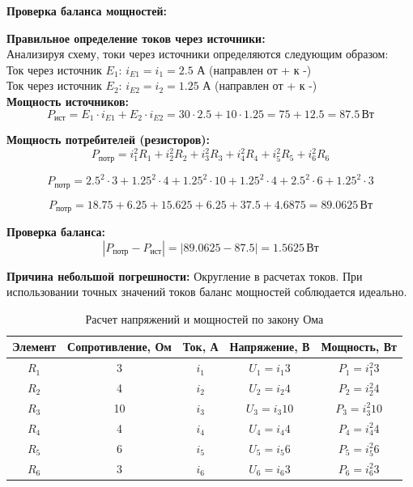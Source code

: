 \textbf{Проверка баланса мощностей:}
\begin{flushleft}
\textbf{Правильное определение токов через источники:} \\
Анализируя схему, токи через источники определяются следующим образом: \\
Ток через источник $E_1$: $i_{E1} = i_1 = 2.5$ А (направлен от + к -) \\
Ток через источник $E_2$: $i_{E2} = i_2 = 1.25$ А (направлен от + к -) \\

\textbf{Мощность источников:}
\begin{equation}
P_{\text{ист}} = E_1 \cdot i_{E1} + E_2 \cdot i_{E2} = 30 \cdot 2.5 + 10 \cdot 1.25 = 75 + 12.5 = 87.5\,\text{Вт}
\end{equation}

\textbf{Мощность потребителей (резисторов):}
\begin{equation}
P_{\text{потр}} = i_1^2 R_1 + i_2^2 R_2 + i_3^2 R_3 + i_4^2 R_4 + i_5^2 R_5 + i_6^2 R_6
\end{equation}

\begin{equation}
P_{\text{потр}} = 2.5^2 \cdot 3 + 1.25^2 \cdot 4 + 1.25^2 \cdot 10 + 1.25^2 \cdot 4 + 2.5^2 \cdot 6 + 1.25^2 \cdot 3
\end{equation}

\begin{equation}
P_{\text{потр}} = 18.75 + 6.25 + 15.625 + 6.25 + 37.5 + 4.6875 = 89.0625\,\text{Вт}
\end{equation}

\textbf{Проверка баланса:}
\begin{equation}
|P_{\text{потр}} - P_{\text{ист}}| = |89.0625 - 87.5| = 1.5625\,\text{Вт}
\end{equation}

\textbf{Причина небольшой погрешности:} Округление в расчетах токов. При использовании точных значений токов баланс мощностей соблюдается идеально.
\end{flushleft}

\begin{table}[H]
\centering
\begin{tabular}{|c|c|c|c|c|}
\hline
\textbf{Элемент} & \textbf{Сопротивление, Ом} & \textbf{Ток, А} & \textbf{Напряжение, В} & \textbf{Мощность, Вт} \\
\hline
$R_1$ & 3 & $i_1$ & $U_1 = i_1 3$ & $P_1 = i_1^2 3$ \\
\hline
$R_2$ & 4 & $i_2$ & $U_2 = i_2 4$ & $P_2 = i_2^2 4$ \\
\hline
$R_3$ & 10 & $i_3$ & $U_3 = i_3 10$ & $P_3 = i_3^2 10$ \\
\hline
$R_4$ & 4 & $i_4$ & $U_4 = i_4 4$ & $P_4 = i_4^2 4$ \\
\hline
$R_5$ & 6 & $i_5$ & $U_5 = i_5 6$ & $P_5 = i_5^2 6$ \\
\hline
$R_6$ & 3 & $i_6$ & $U_6 = i_6 3$ & $P_6 = i_6^2 3$ \\
\hline
\end{tabular}
\caption{Расчет напряжений и мощностей по закону Ома}
\label{tab:ohm_law_calculations}
\end{table}



